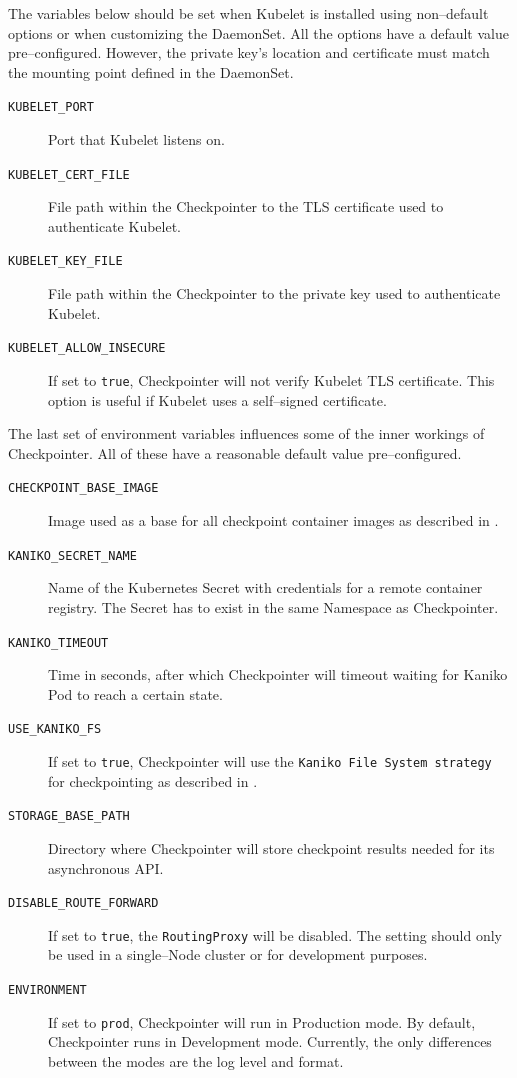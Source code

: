 \documentclass[
  digital,     %
  oneside,     %
  nosansbold,  %
  nocolorbold, %
  lof,         %
  nolot,         %
]{fithesis4}
\begin{document}
The variables below should be set when Kubelet is installed using non--default options or when customizing the DaemonSet. All the options have a default value pre--configured. However, the private key's location and certificate must match the mounting point defined in the DaemonSet.
\begin{description}
    \item[\texttt{KUBELET\_PORT}] Port that Kubelet listens on.
    \item[\texttt{KUBELET\_CERT\_FILE}] File path within the Checkpointer to the TLS certificate used to authenticate Kubelet.
    \item[\texttt{KUBELET\_KEY\_FILE}] File path within the Checkpointer to the private key used to authenticate Kubelet.
    \item[\texttt{KUBELET\_ALLOW\_INSECURE}] If set to \texttt{true}, Checkpointer will not verify Kubelet TLS certificate. This option is useful if Kubelet uses a self--signed certificate.
\end{description}

The last set of environment variables influences some of the inner workings of Checkpointer. All of these have a reasonable default value pre--configured.
\begin{description}
    \item[\texttt{CHECKPOINT\_BASE\_IMAGE}] Image used as a base for all checkpoint container images as described in .
    \item[\texttt{KANIKO\_SECRET\_NAME}] Name of the Kubernetes Secret with credentials for a remote container registry. The Secret has to exist in the same Namespace as Checkpointer.
    \item[\texttt{KANIKO\_TIMEOUT}] Time in seconds, after which Checkpointer will timeout waiting for Kaniko Pod to reach a certain state.
    \item[\texttt{USE\_KANIKO\_FS}] If set to \texttt{true}, Checkpointer will use the \texttt{Kaniko File System strategy} for checkpointing as described in .
    \item[\texttt{STORAGE\_BASE\_PATH}] Directory where Checkpointer will store checkpoint results needed for its asynchronous API.
    \item[\texttt{DISABLE\_ROUTE\_FORWARD}] If set to \texttt{true}, the \texttt{RoutingProxy} will be disabled. The setting should only be used in a single--Node cluster or for development purposes.
     \item[\texttt{ENVIRONMENT}] If set to \texttt{prod}, Checkpointer will run in Production mode. By default, Checkpointer runs in Development mode. Currently, the only differences between the modes are the log level and format.
\end{description}
\end{document}
